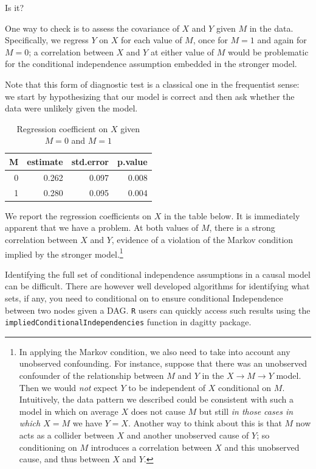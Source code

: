 \documentclass[
  12pt,
]{book}
\begin{document}
Is it?

One way to check is to assess the covariance of \(X\) and \(Y\) given \(M\) in the data. Specifically, we regress \(Y\) on \(X\) for each value of \(M\), once for \(M=1\) and again for \(M=0\); a correlation between \(X\) and \(Y\) at either value of \(M\) would be problematic for the conditional independence assumption embedded in the stronger model.

Note that this form of diagnostic test is a classical one in the frequentist sense: we start by hypothesizing that our model is correct and then ask whether the data were unlikely given the model.

\begin{table}

\caption{\label{tab:unnamed-chunk-42}Regression coefficient on $X$ given $M=0$ and $M=1$}
\centering
\begin{tabular}[t]{r|r|r|r}
\hline
M & estimate & std.error & p.value\\
\hline
0 & 0.262 & 0.097 & 0.008\\
\hline
1 & 0.280 & 0.095 & 0.004\\
\hline
\end{tabular}
\end{table}

We report the regression coefficients on \(X\) in the table below. It is immediately apparent that we have a problem. At both values of \(M\), there is a strong correlation between \(X\) and \(Y\), evidence of a violation of the Markov condition implied by the stronger model.\footnote{In applying the Markov condition, we also need to take into account any unobserved confounding. For instance, suppose that there was an unobserved confounder of the relationship between \(M\) and \(Y\) in the \(X \rightarrow M \rightarrow Y\) model. Then we would \emph{not} expect \(Y\) to be independent of \(X\) conditional on \(M\). Intuitively, the data pattern we described could be consistent with such a model in which on average \(X\) does not cause \(M\) but still \emph{in those cases in which \(X=M\)} we have \(Y=X\). Another way to think about this is that \(M\) now acts as a collider between \(X\) and another unobserved cause of \(Y\); so conditioning on \(M\) introduces a correlation between \(X\) and this unobserved cause, and thus between \(X\) and \(Y\).}

Identifying the full set of conditional independence assumptions in a causal model can be difficult. There are however well developed algorithms for identifying what sets, if any, you need to conditional on to ensure conditional Independence between two nodes given a DAG. \texttt{R} users can quickly access such results using the \texttt{impliedConditionalIndependencies} function in dagitty package.
\end{document}
